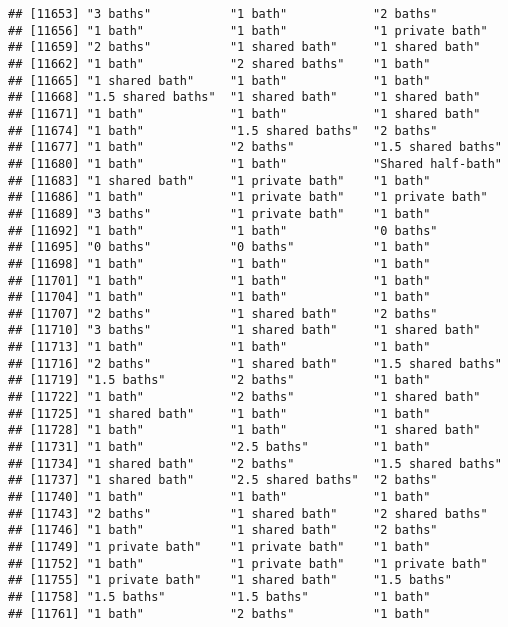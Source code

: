 \documentclass[
]{article}
\begin{document}
\begin{verbatim}
## [11653] "3 baths"           "1 bath"            "2 baths"          
## [11656] "1 bath"            "1 bath"            "1 private bath"   
## [11659] "2 baths"           "1 shared bath"     "1 shared bath"    
## [11662] "1 bath"            "2 shared baths"    "1 bath"           
## [11665] "1 shared bath"     "1 bath"            "1 bath"           
## [11668] "1.5 shared baths"  "1 shared bath"     "1 shared bath"    
## [11671] "1 bath"            "1 bath"            "1 shared bath"    
## [11674] "1 bath"            "1.5 shared baths"  "2 baths"          
## [11677] "1 bath"            "2 baths"           "1.5 shared baths" 
## [11680] "1 bath"            "1 bath"            "Shared half-bath" 
## [11683] "1 shared bath"     "1 private bath"    "1 bath"           
## [11686] "1 bath"            "1 private bath"    "1 private bath"   
## [11689] "3 baths"           "1 private bath"    "1 bath"           
## [11692] "1 bath"            "1 bath"            "0 baths"          
## [11695] "0 baths"           "0 baths"           "1 bath"           
## [11698] "1 bath"            "1 bath"            "1 bath"           
## [11701] "1 bath"            "1 bath"            "1 bath"           
## [11704] "1 bath"            "1 bath"            "1 bath"           
## [11707] "2 baths"           "1 shared bath"     "2 baths"          
## [11710] "3 baths"           "1 shared bath"     "1 shared bath"    
## [11713] "1 bath"            "1 bath"            "1 bath"           
## [11716] "2 baths"           "1 shared bath"     "1.5 shared baths" 
## [11719] "1.5 baths"         "2 baths"           "1 bath"           
## [11722] "1 bath"            "2 baths"           "1 shared bath"    
## [11725] "1 shared bath"     "1 bath"            "1 bath"           
## [11728] "1 bath"            "1 bath"            "1 shared bath"    
## [11731] "1 bath"            "2.5 baths"         "1 bath"           
## [11734] "1 shared bath"     "2 baths"           "1.5 shared baths" 
## [11737] "1 shared bath"     "2.5 shared baths"  "2 baths"          
## [11740] "1 bath"            "1 bath"            "1 bath"           
## [11743] "2 baths"           "1 shared bath"     "2 shared baths"   
## [11746] "1 bath"            "1 shared bath"     "2 baths"          
## [11749] "1 private bath"    "1 private bath"    "1 bath"           
## [11752] "1 bath"            "1 private bath"    "1 private bath"   
## [11755] "1 private bath"    "1 shared bath"     "1.5 baths"        
## [11758] "1.5 baths"         "1.5 baths"         "1 bath"           
## [11761] "1 bath"            "2 baths"           "1 bath"           

\end{verbatim}
\end{document}
